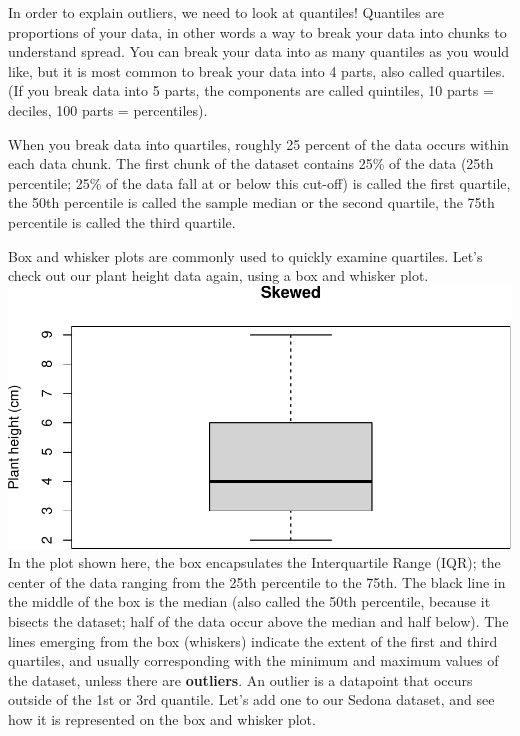\documentclass[
]{book}
\begin{document}
In order to explain outliers, we need to look at quantiles! Quantiles are proportions of your data, in other words a way to break your data into chunks to understand spread. You can break your data into as many quantiles as you would like, but it is most common to break your data into 4 parts, also called quartiles. (If you break data into 5 parts, the components are called quintiles, 10 parts = deciles, 100 parts = percentiles).

When you break data into quartiles, roughly 25 percent of the data occurs within each data chunk. The first chunk of the dataset contains 25\% of the data (25th percentile; 25\% of the data fall at or below this cut-off) is called the first quartile, the 50th percentile is called the sample median or the second quartile, the 75th percentile is called the third quartile.

Box and whisker plots are commonly used to quickly examine quartiles. Let's check out our plant height data again, using a box and whisker plot.
\includegraphics{_main_files/figure-latex/unnamed-chunk-13-1.pdf}
In the plot shown here, the box encapsulates the Interquartile Range (IQR); the center of the data ranging from the 25th percentile to the 75th. The black line in the middle of the box is the median (also called the 50th percentile, because it bisects the dataset; half of the data occur above the median and half below). The lines emerging from the box (whiskers) indicate the extent of the first and third quartiles, and usually corresponding with the minimum and maximum values of the dataset, unless there are \textbf{outliers}. An outlier is a datapoint that occurs outside of the 1st or 3rd quantile. Let's add one to our Sedona dataset, and see how it is represented on the box and whisker plot.
\end{document}
